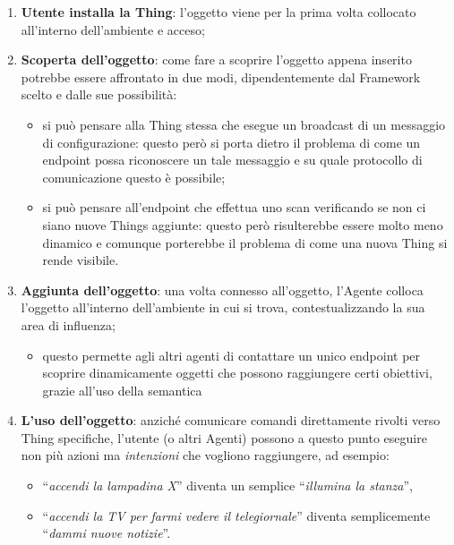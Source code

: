 \documentclass[12pt,a4paper,openright,oneside]{report}
\newcommand{\quotes}[1]{``#1''}
\begin{document}
\begin{enumerate}
	\item \textbf{Utente installa la Thing}: l'oggetto viene per la prima volta collocato all'interno dell'ambiente e acceso;
	
	\item \textbf{Scoperta dell'oggetto}: come fare a scoprire l'oggetto appena inserito potrebbe essere affrontato in due modi, dipendentemente dal Framework scelto e dalle sue possibilità:
	\begin{itemize}
		\item si può pensare alla Thing stessa che esegue un broadcast di un messaggio di configurazione: questo però si porta dietro il problema di come un endpoint possa riconoscere un tale messaggio e su quale protocollo di comunicazione questo è possibile;
		
		\item si può pensare all'endpoint che effettua uno scan verificando se non ci siano nuove Things aggiunte: questo però risulterebbe essere molto meno dinamico e comunque porterebbe il problema di come una nuova Thing si rende visibile.
	\end{itemize}
	
	\item \textbf{Aggiunta dell'oggetto}: una volta connesso all'oggetto, l'Agente colloca l'oggetto all'interno dell'ambiente in cui si trova, contestualizzando la sua area di influenza;
	\begin{itemize}
		\item questo permette agli altri agenti di contattare un unico endpoint per scoprire dinamicamente oggetti che possono raggiungere certi obiettivi, grazie all'uso della semantica
	\end{itemize}
	
	\item \textbf{L'uso dell'oggetto}: anziché comunicare comandi direttamente rivolti verso Thing specifiche, l'utente (o altri Agenti) possono a questo punto eseguire non più azioni ma \textit{intenzioni} che vogliono raggiungere, ad esempio:
	\begin{itemize}
		\item \quotes{\textit{accendi la lampadina X}} diventa un semplice \quotes{\textit{illumina la stanza}},
		\item \quotes{\textit{accendi la TV per farmi vedere il telegiornale}} diventa semplicemente \quotes{\textit{dammi nuove notizie}}.
	\end{itemize}
\end{enumerate}
\end{document}
